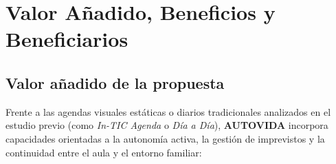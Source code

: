 \newpage
\section{Valor Añadido, Beneficios y Beneficiarios}

\subsection{Valor añadido de la propuesta}
Frente a las agendas visuales estáticas o diarios tradicionales analizados en el estudio previo (como \textit{In-TIC Agenda} o \textit{Día a Día}), \textbf{AUTOVIDA} incorpora capacidades orientadas a la autonomía activa, la gestión de imprevistos y la continuidad entre el aula y el entorno familiar:

